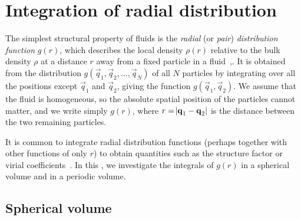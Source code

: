\section{Integration of radial distribution}

\label{sec:radial}

The simplest structural property of fluids is the \emph{radial} (or \emph{pair}) \emph{distribution function} $g(r)$, which describes the local density $\rho(r)$ relative to the bulk density $\rho$ at a distance $r$ away from a fixed particle in a fluid~\cite[257-259]{mcquarrie1976statistical},\cite[54-55]{allen1989computer}.
It is obtained from the distribution $g(\vec{q}_1, \vec{q}_2, \ldots, \vec{q}_N)$ of all $N$ particles by integrating over all the positions except $\vec{q}_1$ and $\vec{q}_2$, giving the function $g(\vec{q}_1, \vec{q}_2)$.
We assume that the fluid is homogeneous, so the absolute spatial position of the particles cannot matter, and we write simply $g(r)$, where $r = \abs{\bm{\mathbf{q}}_1 - \bm{\mathbf{q}}_2}$ is the distance between the two remaining particles.

It is common to integrate radial distribution functions (perhaps together with other functions of only $r$) to obtain quantities such as the structure factor or virial coefficients~\cite[260,263]{mcquarrie1976statistical}.
In this , we investigate the integrals of $g(r)$ in a spherical volume and in a periodic volume.


\subsection{Spherical volume}

